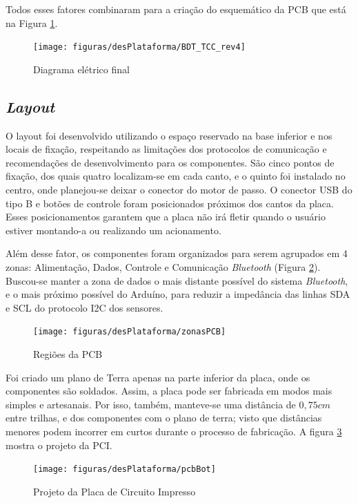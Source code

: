 Todos esses fatores combinaram para a criação do esquemático da PCB que está na Figura \ref{fig:BDT_TCC_rev4}. 
\begin{figure}[!htb]
	\centering
	\caption{Diagrama elétrico final}
	\texttt{[image: figuras/desPlataforma/BDT\_TCC\_rev4]}
	\label{fig:BDT_TCC_rev4}
\end{figure}




\subsection{\textit{Layout}}
O layout foi desenvolvido utilizando o espaço reservado na base inferior e nos locais de fixação, respeitando as limitações dos protocolos de comunicação e recomendações de desenvolvimento para os componentes. São cinco pontos de fixação, dos quais quatro localizam-se em cada canto, e o quinto foi instalado no centro, onde planejou-se deixar o conector do motor de passo. O conector USB do tipo B e botões de controle foram posicionados próximos dos cantos da placa. Esses posicionamentos garantem que a placa não irá fletir quando o usuário estiver montando-a ou realizando um acionamento. 

Além desse fator, os componentes foram organizados para serem agrupados em 4 zonas: Alimentação, Dados, Controle e Comunicação \textit{Bluetooth} (Figura \ref{fig:zonasPcb}). Buscou-se manter a zona de dados o mais distante possível do sistema \textit{Bluetooth}, e o mais próximo possível do Arduíno, para reduzir a impedância das linhas SDA e SCL do protocolo I2C dos sensores.

\begin{figure}[!htb]
	\centering
	\caption{Regiões da PCB}
	\texttt{[image: figuras/desPlataforma/zonasPCB]}
	\label{fig:zonasPcb}
\end{figure}  

Foi criado um plano de Terra apenas na parte inferior da placa, onde os componentes são soldados. Assim, a placa pode ser fabricada em modos mais simples e artesanais. Por isso, também, manteve-se uma distância de $ 0,75 cm $ entre trilhas, e dos componentes com o plano de terra; visto que distâncias menores podem incorrer em curtos durante o processo de fabricação. A figura \ref{fig:pcbBot} mostra o projeto da PCI.

\begin{figure}[!htb]
	\centering
	\caption{Projeto da Placa de Circuito Impresso}
	\texttt{[image: figuras/desPlataforma/pcbBot]}
	\label{fig:pcbBot}
\end{figure}


